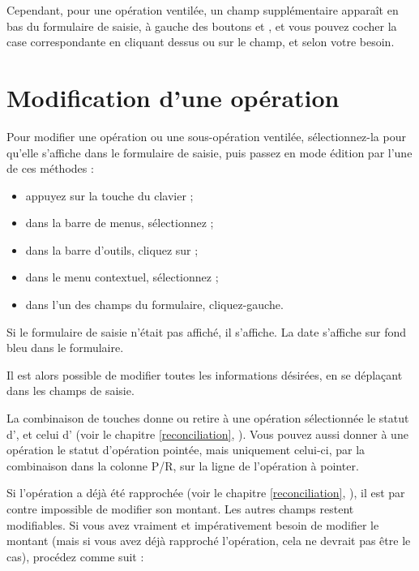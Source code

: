 Cependant, pour une opération ventilée, un champ supplémentaire  apparaît en bas du formulaire de saisie, à gauche des boutons  et , et vous pouvez cocher la case correspondante en cliquant dessus ou sur le champ, et selon votre besoin.


\section{Modification d'une opération\label{transactions-modify}}


Pour modifier une opération ou une sous-opération ventilée, sélectionnez-la pour qu'elle s'affiche dans le formulaire de saisie, puis passez en mode édition par l'une de ces méthodes :

\begin{itemize}
	 \item appuyez sur la touche du clavier  ;
	 \item dans la barre de menus, sélectionnez  ;
	 \item dans la barre d'outils, cliquez sur  ;
	 \item dans le menu contextuel, sélectionnez  ;
	 \item dans l'un des champs du formulaire, cliquez-gauche.
\end{itemize}
 
Si le formulaire de saisie n'était pas affiché, il s'affiche. La date s'affiche sur fond bleu{\couleur} dans le formulaire.

Il est alors possible de modifier toutes les informations désirées, en se déplaçant dans les champs de saisie. 

La combinaison de touches   donne ou retire à une opération sélectionnée le statut d', et   celui d' (voir le chapitre \vref{reconciliation}, ). Vous pouvez aussi donner à une opération le statut d'opération pointée, mais uniquement celui-ci, par la combinaison   dans la colonne P/R, sur la ligne de l'opération à pointer.

Si l'opération a déjà été rapprochée (voir le chapitre \vref{reconciliation}, ), il est par contre impossible de modifier son montant. Les autres champs restent modifiables. Si vous avez vraiment et impérativement besoin de modifier le montant (mais si vous avez déjà rapproché l'opération, cela ne devrait pas être le cas), procédez comme suit :

